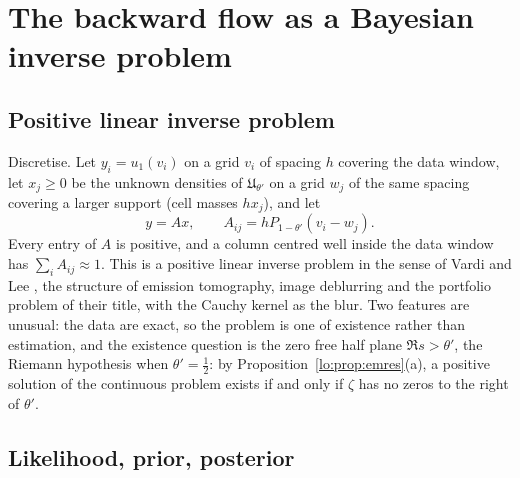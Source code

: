 \section{The backward flow as a Bayesian inverse problem}\label{lo:sec:bayes}

\subsection{Positive linear inverse problem}

Discretise. Let $y_i=u_1(v_i)$ on a grid $v_i$ of spacing $h$ covering the data window, let $x_j\ge0$ be the unknown densities of $\mathfrak U_{\theta'}$ on a grid $w_j$ of the same spacing covering a larger support (cell masses $hx_j$), and let
\begin{equation}\label{lo:eq:plip}
y=Ax,\qquad A_{ij}=hP_{1-\theta'}(v_i-w_j).
\end{equation}
Every entry of $A$ is positive, and a column centred well inside the data window has $\sum_iA_{ij}\approx1$. This is a positive linear inverse problem in the sense of Vardi and Lee \cite{VardiLee93}, the structure of emission tomography, image deblurring and the portfolio problem of their title, with the Cauchy kernel as the blur. Two features are unusual: the data are exact, so the problem is one of existence rather than estimation, and the existence question is the zero free half plane $\Re s>\theta'$, the Riemann hypothesis when $\theta'=\tfrac12$: by Proposition~\ref{lo:prop:emres}(a), a positive solution of the continuous problem exists if and only if $\zeta$ has no zeros to the right of $\theta'$.

\subsection{Likelihood, prior, posterior}

